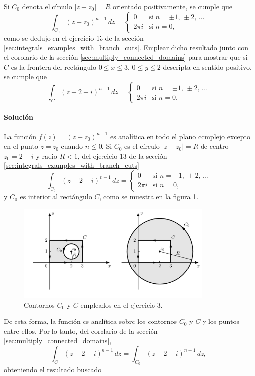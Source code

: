 \documentclass[a4paper]{report}
\begin{document}
Si \(C_0\) denota el círculo \(|z-z_0|=R\) orientado positivamente, se cumple que
\[
 \int_{C_0}(z-z_0)^{n-1}\,dz=
 \left\{ 
 \begin{array}{ll}
  0 &\textrm{si }n=\pm1,\,\pm2,\,\dots\\
  2\pi i&\textrm{si }n=0,
 \end{array}
 \right.
\]
como se dedujo en el ejercicio 13 de la sección \ref{sec:integrals_examples_with_branch_cuts}. 
Emplear dicho resultado junto con el corolario de la sección \ref{sec:multiply_connected_domains} para mostrar que si \(C\) es la frontera del rectángulo \(0\leq x\leq3\), \(0\leq y\leq2\) descripta en sentido positivo, se cumple que 
\[
 \int_{C}(z-2-i)^{n-1}\,dz=
 \left\{ 
 \begin{array}{ll}
  0 &\textrm{si }n=\pm1,\,\pm2,\,\dots\\
  2\pi i&\textrm{si }n=0.
 \end{array}
 \right.
\]

\paragraph{Solución} La función \(f(z)=(z-z_0)^{n-1}\) es analítica en todo el plano complejo excepto en el punto \(z=z_0\) cuando \(n\leq0\). Si \(C_0\) es el círculo \(|z-z_0|=R\) de centro \(z_0=2+i\) y radio \(R<1\), del ejercicio 13 de la sección \ref{sec:integrals_examples_with_branch_cuts}
\[
 \int_{C_0}(z-2-i)^{n-1}\,dz=
 \left\{ 
 \begin{array}{ll}
  0 &\textrm{si }n=\pm1,\,\pm2,\,\dots\\
  2\pi i&\textrm{si }n=0,
 \end{array}
 \right.
\]
y \(C_0\) es interior al rectángulo \(C\), como se muestra en la figura \ref{fig:exercise_53_03}.
\begin{figure}[!htb]
 \begin{center}
 \includegraphics[width=0.85\textwidth]{figuras/exercise_53_03.pdf}
 \caption{\label{fig:exercise_53_03} Contornos \(C_0\) y \(C\) empleados en el ejercicio 3.}
 \end{center}
\end{figure}
De esta forma, la función es analítica sobre los contornos \(C_0\) y \(C\) y los puntos entre ellos. Por lo tanto, del corolario de la sección \ref{sec:multiply_connected_domains},
\[
 \int_{C}(z-2-i)^{n-1}\,dz=\int_{C_0}(z-2-i)^{n-1}\,dz,
\]
obteniendo el resultado buscado.
\end{document}
